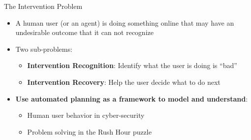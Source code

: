 \begin{frame}{The Intervention Problem}
	\begin{itemize}
		\item A human user (or an agent) is doing something online that may have an undesirable outcome that it can not recognize
		\item Two sub-problems:
		\begin{itemize}
		\item \textbf{Intervention Recognition}: Identify what the user is doing is ``bad''
		\item \textbf{Intervention Recovery}: Help the user decide what to do next
		\end{itemize}
		\item \textbf{Use automated planning as a framework to model and understand}:
		\begin{itemize}
		\item Human user behavior in cyber-security
		\item Problem solving in the Rush Hour puzzle
		\end{itemize}
	\end{itemize}
\end{frame}